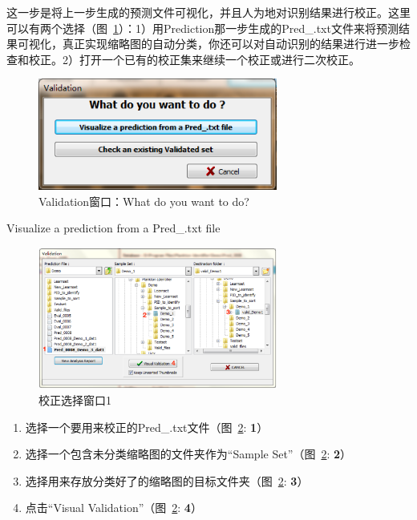 \documentclass[12pt]{article}
\begin{document}
这一步是将上一步生成的预测文件可视化，并且人为地对识别结果进行校正。这里可以有两个选择（图~\ref{fig: ValidationWindow}）：1）用Prediction那一步生成的Pred\_.txt文件来将预测结果可视化，真正实现缩略图的自动分类，你还可以对自动识别的结果进行进一步检查和校正。2）打开一个已有的校正集来继续一个校正或进行二次校正。

\begin{figure}[!ht]
\centering
\includegraphics[width=0.7\textwidth]{ValidationWindow.png}
\caption{Validation窗口：What do you want to do?}
\label{fig: ValidationWindow}
\end{figure}

{\color{red}Visualize a prediction from a Pred\_.txt file}

\begin{figure}[!ht]
\centering
\includegraphics[width=0.7\textwidth]{SelectionWindowforValidation1.eps}
\caption{校正选择窗口1}
\label{fig: SelectionWindowforValidation1}
\end{figure}

\begin{enumerate}
\item 选择一个要用来校正的Pred\_.txt文件（图~\ref{fig: SelectionWindowforValidation1}: {\color{red}\textbf{1}}）
\item 选择一个包含未分类缩略图的文件夹作为“Sample Set”（图~\ref{fig: SelectionWindowforValidation1}: {\color{red}\textbf{2}}）
\item 选择用来存放分类好了的缩略图的目标文件夹（图~\ref{fig: SelectionWindowforValidation1}: {\color{red}\textbf{3}}）
\item 点击“Visual Validation”（图~\ref{fig: SelectionWindowforValidation1}: {\color{red}\textbf{4}}）
\end{enumerate}
\end{document}
